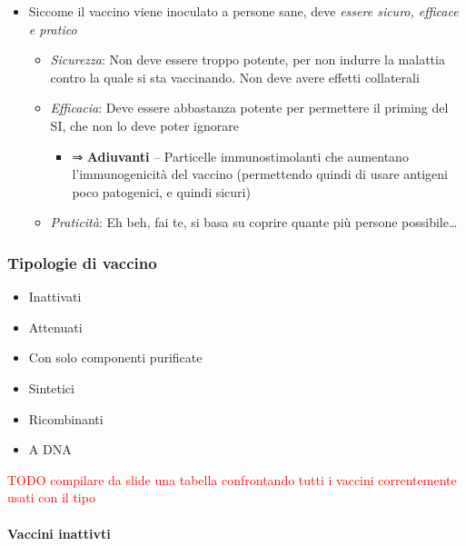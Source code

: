 \documentclass[italian,]{article}
\providecommand{\tightlist}{%
  \setlength{\itemsep}{0pt}\setlength{\parskip}{0pt}}
\newcommand{\TODO}[1]{\textcolor{red}{\textsf{\footnotesize{TODO #1}}}} %
\begin{document}
\begin{itemize}
\tightlist
\item
  Siccome il vaccino viene inoculato a persone sane, deve \emph{essere
  sicuro, efficace e pratico}

  \begin{itemize}
  \tightlist
  \item
    \emph{Sicurezza}: Non deve essere troppo potente, per non indurre la
    malattia contro la quale si sta vaccinando. Non deve avere effetti
    collaterali
  \item
    \emph{Efficacia}: Deve essere abbastanza potente per permettere il
    priming del SI, che non lo deve poter ignorare

    \begin{itemize}
    \tightlist
    \item
      ⇒ \textbf{Adiuvanti} -- Particelle immunostimolanti che aumentano
      l'immunogenicità del vaccino (permettendo quindi di usare antigeni
      poco patogenici, e quindi sicuri)
    \end{itemize}
  \item
    \emph{Praticità}: Eh beh, fai te, si basa su coprire quante più
    persone possibile\ldots{}
  \end{itemize}
\end{itemize}

\hypertarget{tipologie-di-vaccino}{%
\subsubsection{Tipologie di vaccino}\label{tipologie-di-vaccino}}

\begin{itemize}
\tightlist
\item
  Inattivati
\item
  Attenuati
\item
  Con solo componenti purificate
\item
  Sintetici
\item
  Ricombinanti
\item
  A DNA
\end{itemize}

\TODO{compilare da slide una tabella confrontando tutti i vaccini correntemente usati con il tipo}

\hypertarget{vaccini-inattivti}{%
\paragraph{Vaccini inattivti}\label{vaccini-inattivti}}
\end{document}
